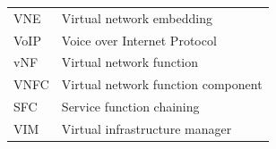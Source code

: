 \documentclass[futureinternet,review,accept,pdftex,moreauthors]{Definitions/mdpi}
\begin{document}
{\begin{tabular}{@{}m{2cm}<{\raggedright}m{10cm}<{\raggedright}}
VNE & Virtual network embedding \\

VoIP & Voice over Internet Protocol \\

vNF & Virtual network function \\

VNFC & Virtual network function component \\

SFC & Service function chaining \\

VIM & Virtual infrastructure manager \\
\end{tabular}
}
\end{document}
